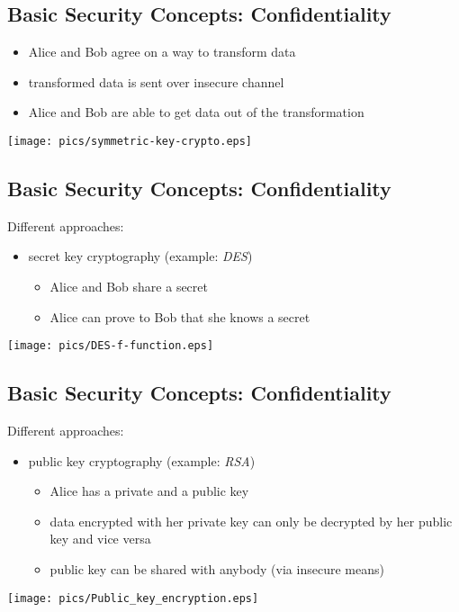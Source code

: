 \documentclass[xga]{xdvislides}
\begin{document}
\subsection{Basic Security Concepts: Confidentiality}
\begin{itemize}
	\item Alice and Bob agree on a way to transform data
	\item transformed data is sent over insecure channel
	\item Alice and Bob are able to get data out of the transformation
\end{itemize}
\addvspace{.5in}
\begin{center}
	\texttt{[image: pics/symmetric-key-crypto.eps]}
\end{center}

\subsection{Basic Security Concepts: Confidentiality}
Different approaches:
\begin{itemize}
	\item secret key cryptography (example: {\em DES})
		\begin{itemize}
			\item Alice and Bob share a secret
			\item Alice can prove to Bob that she knows a secret
		\end{itemize}
\end{itemize}
 \begin{center}
        \texttt{[image: pics/DES-f-function.eps]} \\
 \end{center}

\subsection{Basic Security Concepts: Confidentiality}
Different approaches:
\begin{itemize}
	\item public key cryptography (example: {\em RSA})
		\begin{itemize}
			\item Alice has a private and a public key
			\item data encrypted with her private key can only be decrypted by
				her public key and vice versa
			\item public key can be shared with anybody (via insecure means)
		\end{itemize}
\end{itemize}
\begin{center}
	\texttt{[image: pics/Public\_key\_encryption.eps]}
 \end{center}
\end{document}
